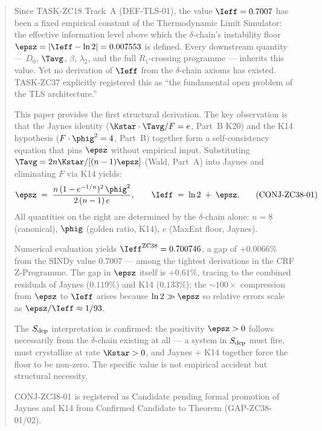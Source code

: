 \documentclass[12pt, a4paper]{article}
\begin{document}
\begin{abstract}
\sloppy
Since TASK-ZC18 Track~A (DEF-TLS-01), the value $\Ieff = 0.7007$
has been a fixed empirical constant of the Thermodynamic Limit Simulator:
the effective information level above which the $\delta$-chain's instability
floor $\epsz = |\Ieff - \ln 2| = 0.007553$ is defined.
Every downstream quantity --- $D_0$, $\Tavg$, $\beta$, $\lambda_2$,
and the full $R_1$-crossing programme --- inherits this value.
Yet no derivation of $\Ieff$ from the $\delta$-chain axioms has existed.
TASK-ZC37 explicitly registered this as ``the fundamental open problem
of the TLS architecture.''

This paper provides the first structural derivation.
The key observation is that the Jaynes identity
($\Kstar \cdot \Tavg / F = e$, Part~B K20) and the K14 hypothesis
($F \cdot \phig^2 = 4$, Part~B) together form a self-consistency
equation that pins $\epsz$ without empirical input.
Substituting $\Tavg = 2n\Kstar / [(n-1)\epsz]$ (Wald, Part~A)
into Jaynes and eliminating $F$ via K14 yields:
\[
  \epsz \;=\; \frac{n\,(1-e^{-1/n})^2\,\phig^2}{2\,(n-1)\,e},
  \qquad
  \Ieff \;=\; \ln 2 \;+\; \epsz.
  \tag{CONJ-ZC38-01}
\]
All quantities on the right are determined by the $\delta$-chain alone:
$n = 8$ (canonical), $\phig$ (golden ratio, K14), $e$ (MaxEnt floor, Jaynes).

Numerical evaluation yields $\Ieff^{\rm ZC38} = 0.700746$,
a gap of $+0.0066\%$ from the SINDy value $0.7007$ ---
among the tightest derivations in the CRF Z-Programme.
The gap in $\epsz$ itself is $+0.61\%$, tracing to the combined
residuals of Jaynes ($0.119\%$) and K14 ($0.133\%$); the
$\sim\!100\times$ compression from $\epsz$ to $\Ieff$ arises because
$\ln 2 \gg \epsz$ so relative errors scale as $\epsz / \Ieff \approx 1/93$.

The $S_{\rm dep}$ interpretation is confirmed:
the positivity $\epsz > 0$ follows necessarily from the $\delta$-chain
existing at all --- a system in $S_{\rm dep}$ must fire,
must crystallize at rate $\Kstar > 0$,
and Jaynes + K14 together force the floor to be non-zero.
The specific value is not empirical accident but structural necessity.

CONJ-ZC38-01 is registered as Candidate pending formal promotion of
Jaynes and K14 from Confirmed Candidate to Theorem (GAP-ZC38-01/02).
\end{abstract}

\tableofcontents

\newpage
\end{document}
